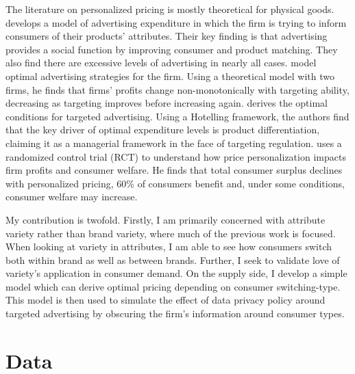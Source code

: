 \documentclass[11pt]{article}
\theoremstyle{definition}
\theoremstyle{remark}
\begin{document}

The literature on personalized pricing is mostly theoretical for physical goods. \citet{grossman_informative_1984} develops a model of advertising expenditure in which the firm is trying to inform consumers of their products' attributes. Their key finding is that advertising provides a social function by improving consumer and product matching. They also find there are excessive levels of advertising in nearly all cases. \citet{karle_imperfect_nodate} model optimal advertising strategies for the firm. Using a theoretical model with two firms, he finds that firms' profits change non-monotonically with targeting ability, decreasing as targeting improves before increasing again. \citet{moorthy_targeting_2023} derives the optimal conditions for targeted advertising. Using a Hotelling framework, the authors find that the key driver of optimal expenditure levels is product differentiation, claiming it as a managerial framework in the face of targeting regulation. \citet{dube_personalized_2023} uses a randomized control trial (RCT) to understand how price personalization impacts firm profits and consumer welfare. He finds that total consumer surplus declines with personalized pricing, 60\% of consumers benefit and, under some conditions, consumer welfare may increase.


My contribution is twofold. Firstly, I am primarily concerned with attribute variety rather than brand variety, where much of the previous work is focused. When looking at variety in attributes, I am able to see how consumers switch both within brand as well as between brands. Further, I seek to validate love of variety's application in consumer demand. On the supply side, I develop a simple model which can derive optimal pricing depending on consumer switching-type. This model is then used to simulate the effect of data privacy policy around targeted advertising by obscuring the firm's information around consumer types. 


\section{Data}
\end{document}
